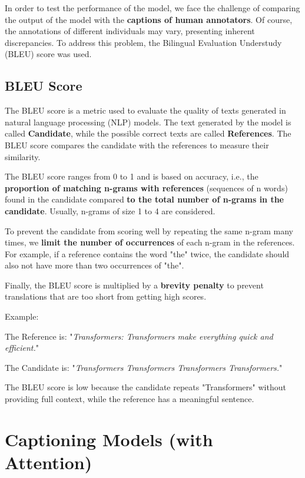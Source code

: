 In order to test the performance of the model, we face the challenge of comparing the output of the model with the \textbf{captions of human annotators}. Of course, the annotations of different individuals may vary, presenting inherent discrepancies. To address this problem, the Bilingual Evaluation Understudy (BLEU) score was used.

\subsection{BLEU Score}

The BLEU score is a metric used to evaluate the quality of texts generated in natural language processing (NLP) models. The text generated by the model is called \textbf{Candidate}, while the possible correct texts are called \textbf{References}. The BLEU score compares the candidate with the references to measure their similarity.

The BLEU score ranges from 0 to 1 and is based on accuracy, i.e., the \textbf{proportion of matching n-grams with references} (sequences of n words) found in the candidate compared \textbf{to the total number of n-grams in the candidate}. Usually, n-grams of size 1 to 4 are considered.

To prevent the candidate from scoring well by repeating the same n-gram many times, we \textbf{limit the number of occurrences} of each n-gram in the references. For example, if a reference contains the word "the" twice, the candidate should also not have more than two occurrences of "the".

Finally, the BLEU score is multiplied by a \textbf{brevity penalty} to prevent translations that are too short from getting high scores. 

Example:

\; The Reference is: "\textit{Transformers: Transformers make everything quick and efficient.}" 

\; The Candidate is: "\textit{Transformers Transformers Transformers Transformers.}" \ 
 
The BLEU score is low because the candidate repeats "Transformers" without providing full context, while the reference has a meaningful sentence. 

\section{Captioning Models (with Attention)}

